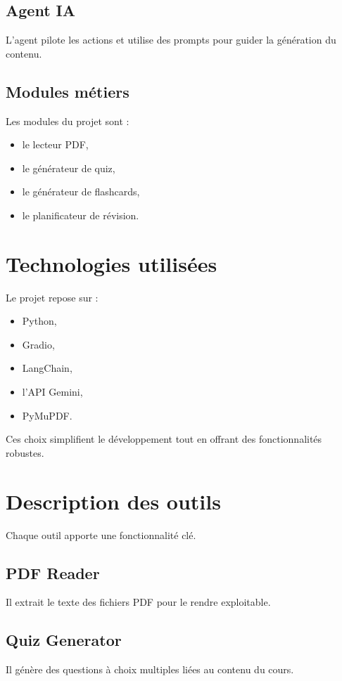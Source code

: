 ﻿\documentclass[12pt,a4paper]{report}
\begin{document}
\section{Agent IA}
L'agent pilote les actions et utilise des prompts pour guider la génération du contenu.

\section{Modules métiers}
Les modules du projet sont :
\begin{itemize}
    \item le lecteur PDF,
    \item le générateur de quiz,
    \item le générateur de flashcards,
    \item le planificateur de révision.
\end{itemize}

\chapter{Technologies utilisées}
Le projet repose sur :
\begin{itemize}
    \item Python,
    \item Gradio,
    \item LangChain,
    \item l'API Gemini,
    \item PyMuPDF.
\end{itemize}

Ces choix simplifient le développement tout en offrant des fonctionnalités robustes.

\chapter{Description des outils}
Chaque outil apporte une fonctionnalité clé.

\section{PDF Reader}
Il extrait le texte des fichiers PDF pour le rendre exploitable.

\section{Quiz Generator}
Il génère des questions à choix multiples liées au contenu du cours.
\end{document}
